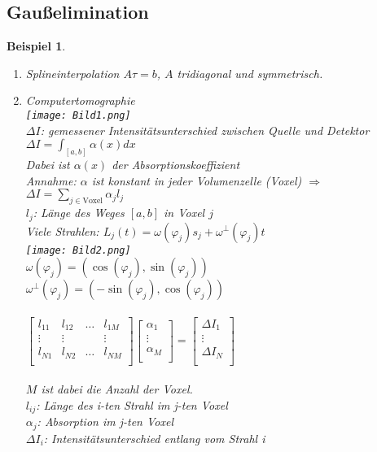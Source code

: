 \documentclass[12pt]{article}
\theoremstyle{break}
\newtheorem{example}[theorem]{Beispiel}
\begin{document}
\subsection{Gaußelimination}
%
\begin{example}\leavevmode
\begin{enumerate}
  \item[a)] Splineinterpolation $A\tau = b$, $A$ tridiagonal und symmetrisch.
  \item[b)] Computertomographie \\
    \texttt{[image: Bild1.png]}\\
    $\Delta I$: gemessener Intensitätsunterschied zwischen Quelle und Detektor \\
    $\Delta I = \int_{[a,b]} \alpha(x) dx$\\
    Dabei ist $\alpha(x)$ der Absorptionskoeffizient\\
    Annahme: $\alpha$ ist konstant in jeder Volumenzelle (Voxel) $\Rightarrow$\\
    $\Delta I = \sum_{j \in \text{Voxel}} \alpha_j l_j$\\
    $l_j$: Länge des Weges $[a,b]$ in Voxel $j$\\
    Viele Strahlen: $L_j(t) = \omega ( \varphi_j ) s_j + \omega^{\perp} ( \varphi_j ) t$\\
    \texttt{[image: Bild2.png]}\\
    $\omega(\varphi_j) = (\cos(\varphi_j), \sin(\varphi_j))$\\
    $\omega^{\perp}(\varphi_j) = (-\sin(\varphi_j), \cos(\varphi_j))$ \\\\
    $\begin{bmatrix} 
    l_{11} & l_{12} & \dots & l_{1M} \\
    \vdots & \vdots & & \vdots \\
    l_{N1} & l_{N2} & \dots & l_{NM} \\
    \end{bmatrix}
    \begin{bmatrix}
    \alpha_1 \\
    \vdots \\
    \alpha_M \\
    \end{bmatrix}
    =
    \begin{bmatrix}
    \Delta I_1 \\
    \vdots \\
    \Delta I_N \\
    \end{bmatrix}$\\\\
    $M$ ist dabei die Anzahl der Voxel.\\
    $l_{ij}$: Länge des i-ten Strahl im j-ten Voxel\\
    $\alpha_j$: Absorption im j-ten Voxel \\
    $\Delta I_i$: Intensitätsunterschied entlang vom Strahl i
\end{enumerate}
\end{example}
\end{document}
